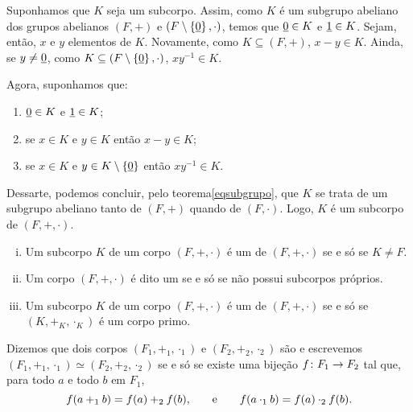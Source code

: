\begin{dem}
  Suponhamos
  que $K$ seja um subcorpo. Assim, como $K$ é um subgrupo abeliano
  dos grupos
  abelianos $(F,+)$ e $(F\setminus\left\{ \underline{0} \right\},\cdot)$, temos que
  $\underline{0}\in K$ e $\underline{1}\in K$. Sejam, então, $x$ e $y$ elementos de $K$.
  Novamente, como $K\subseteq(F,+)$, $x-y\in K$. Ainda, se $y\neq\underline{0}$,
  como $K\subseteq(F\setminus\left\{ \underline{0} \right\},\cdot)$, $xy^{-1}\in K$.

  Agora, suponhamos que:
  \begin{enumerate}
    \item $\underline{0}\in K$ e $\underline{1}\in K$;
    \item se $x\in K$ e $y\in K$ então $x-y\in K$;
    \item se $x\in K$ e $y\in K\setminus\left\{ \underline{0} \right\}$ então $xy^{-1}\in
      K$.
  \end{enumerate}
  Dessarte, podemos concluir, pelo teorema\xspace\ref{eqsubgrupo},
  que $K$ se trata de
  um subgrupo abeliano tanto de
  $(F,+)$ quando de $(F,\cdot)$. Logo, $K$ é um subcorpo de
  $(F,+,\cdot)$.
\end{dem}

\begin{Nom}
  \begin{enumerate}[(i)]
    \item  Um subcorpo $K$ de um corpo $(F,+,\cdot)$ é um
       de $(F,+,\cdot)$ se e só se $K\neq F$.
    \item  Um corpo $(F,+,\cdot)$ é dito um  se e
      só se não
      possui subcorpos próprios.
    \item Um subcorpo $K$ de um corpo $(F,+,\cdot)$ é um
     de $(F,+,\cdot)$ se e só se
    $(K,+_K,\cdot_K)$ é um corpo primo.
  \end{enumerate}
\end{Nom}

\begin{Def}
  Dizemos que dois corpos $(F_1,+_1,\cdot_1)$ e $(F_2,+_2,\cdot_2)$ são
   e escrevemos
  $(F_1,+_1,\cdot_1)\simeq (F_2,+_2,\cdot_2)$ se e só se existe uma
  bijeção
  $f\colon F_1\rightarrow F_2$ tal que, para todo $a$ e todo $b$ em $F_1$,
  \begin{equation*}
    f(a+_1b) = f(a)+_2f(b)\mathrm{,}\qquad\text{e}\qquad
    f(a\cdot_1b) = f(a)\cdot_2f(b)\mathrm{.}
  \end{equation*}
\end{Def}

